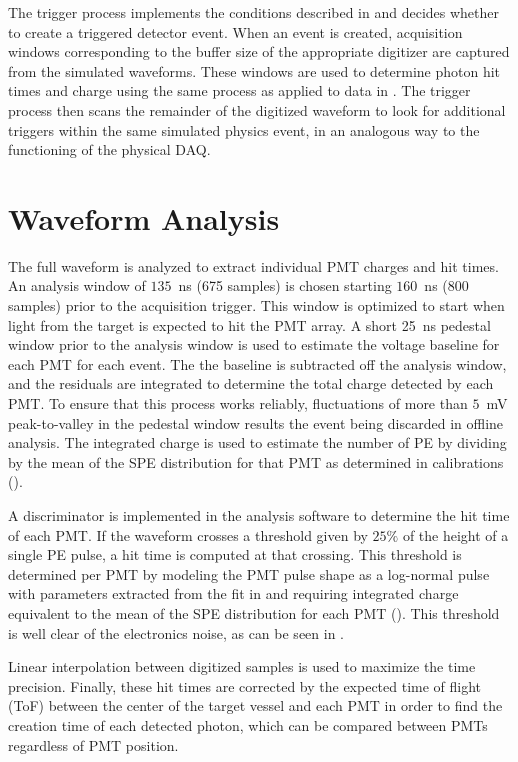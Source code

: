 The trigger process implements the conditions described in  and decides whether to create a triggered detector event. 
When an event is created, acquisition windows corresponding to the buffer size of the appropriate digitizer are captured from the simulated waveforms.
These windows are used to determine photon hit times and charge using the same process as applied to data in .  
The trigger process then scans the remainder of the digitized waveform to look for additional triggers within the same simulated physics event, in an analogous way to the functioning of the physical DAQ.


\section{Waveform Analysis}\label{s:analysis}

The full waveform is analyzed to extract individual PMT charges and hit times. 
An analysis window of $135$~ns (675 samples) is chosen starting $160$~ns (800 samples) prior to the acquisition trigger. 
This window is optimized to start when light from the target is expected to hit the PMT array. 
A short 25~ns pedestal window prior to the analysis window is used to estimate the voltage baseline for each PMT for each event.
The the baseline is subtracted off the analysis window, and the residuals are integrated to determine the total charge detected by each PMT. 
To ensure that this process works reliably, fluctuations of more than $5$~mV peak-to-valley in the pedestal window results the event being discarded in offline analysis.  
The integrated charge is used to estimate the number of PE by dividing by the mean of the SPE distribution for that PMT as determined in calibrations ().

A discriminator is implemented in the analysis software to determine the hit time of each PMT.
If the waveform crosses a threshold given by $25\%$ of the height of a single PE pulse, a hit time is computed at that crossing.
This threshold is determined per PMT by modeling the PMT pulse shape as a log-normal pulse with parameters extracted from the fit in  and requiring integrated charge equivalent to the mean of the SPE distribution for each PMT (). 
This threshold is well clear of the electronics noise, as can be seen in . 

Linear interpolation between digitized samples is used to maximize the time precision. 
Finally, these hit times are corrected by the expected time of flight (ToF) between the center of the target vessel and each PMT in order to find the creation time of each detected photon, which can be compared between PMTs regardless of PMT position.


